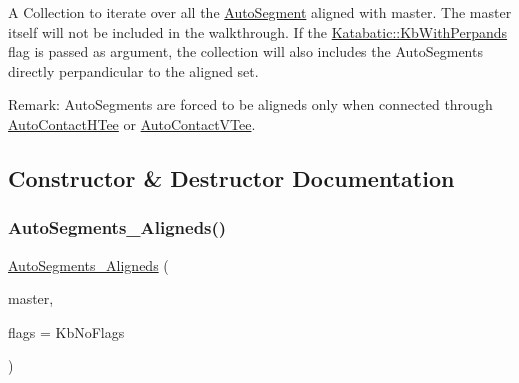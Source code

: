 A Collection to iterate over all the \mbox{\hyperlink{classKatabatic_1_1AutoSegment}{Auto\+Segment}} aligned with {\ttfamily master}. The {\ttfamily master} itself will not be included in the walkthrough. If the \mbox{\hyperlink{namespaceKatabatic_a2af2ad6b6441614038caf59d04b3b217ae2d033c8f78b61468c827de8db5fe839}{Katabatic\+::\+Kb\+With\+Perpands}} flag is passed as argument, the collection will also includes the Auto\+Segments directly perpandicular to the aligned set.

\begin{DoxyParagraph}{Remark\+: Auto\+Segments are forced to be aligneds only when connected through}
\mbox{\hyperlink{classKatabatic_1_1AutoContactHTee}{Auto\+Contact\+H\+Tee}} or \mbox{\hyperlink{classKatabatic_1_1AutoContactVTee}{Auto\+Contact\+V\+Tee}}. 
\end{DoxyParagraph}


\subsection{Constructor \& Destructor Documentation}
\mbox{\label{classKatabatic_1_1AutoSegments__Aligneds_a97d48d49a2372cf289d321e6abf81c2d}} 
\subsubsection{\texorpdfstring{Auto\+Segments\+\_\+\+Aligneds()}{AutoSegments\_Aligneds()}\hspace{0.1cm}{\footnotesize\ttfamily [1/2]}}
{\footnotesize\ttfamily \mbox{\hyperlink{classKatabatic_1_1AutoSegments__Aligneds}{Auto\+Segments\+\_\+\+Aligneds}} (\begin{DoxyParamCaption}\item[{\mbox{\hyperlink{classKatabatic_1_1AutoSegment}{Auto\+Segment}} $\ast$}]{master,  }\item[{unsigned int}]{flags = {\ttfamily KbNoFlags} }\end{DoxyParamCaption})\hspace{0.3cm}{\ttfamily [inline]}}

